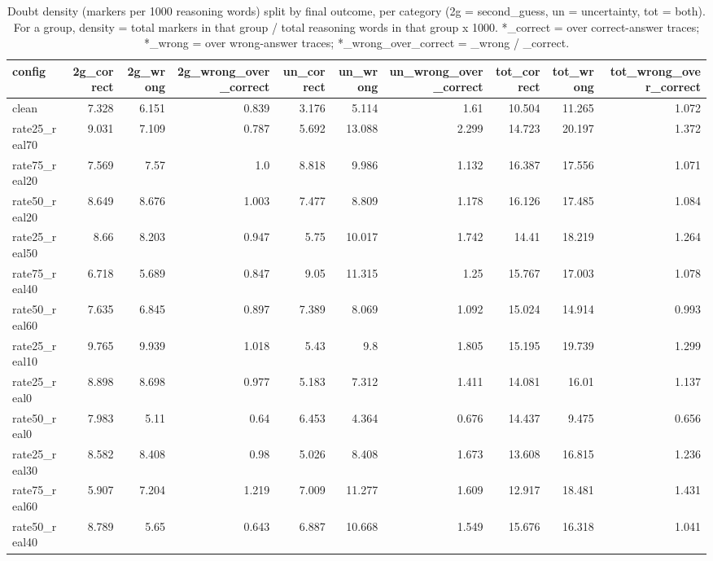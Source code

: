 \documentclass[11pt]{article}
\begin{document}
\begin{table}[H]
\centering
\caption{Doubt density (markers per 1000 reasoning words) split by final outcome, per category (2g = second\_guess, un = uncertainty, tot = both). For a group, density = total markers in that group / total reasoning words in that group x 1000. *\_correct = over correct-answer traces; *\_wrong = over wrong-answer traces; *\_wrong\_over\_correct = \_wrong / \_correct.}
\small
\begin{adjustbox}{max width=\textwidth}
\begin{tabular}{lrrrrrrrrr}
\toprule
\textbf{config} & \textbf{2g\_correct} & \textbf{2g\_wrong} & \textbf{2g\_wrong\_over\_correct} & \textbf{un\_correct} & \textbf{un\_wrong} & \textbf{un\_wrong\_over\_correct} & \textbf{tot\_correct} & \textbf{tot\_wrong} & \textbf{tot\_wrong\_over\_correct} \\
\midrule
clean & 7.328 & 6.151 & 0.839 & 3.176 & 5.114 & 1.61 & 10.504 & 11.265 & 1.072 \\
rate25\_real70 & 9.031 & 7.109 & 0.787 & 5.692 & 13.088 & 2.299 & 14.723 & 20.197 & 1.372 \\
rate75\_real20 & 7.569 & 7.57 & 1.0 & 8.818 & 9.986 & 1.132 & 16.387 & 17.556 & 1.071 \\
rate50\_real20 & 8.649 & 8.676 & 1.003 & 7.477 & 8.809 & 1.178 & 16.126 & 17.485 & 1.084 \\
rate25\_real50 & 8.66 & 8.203 & 0.947 & 5.75 & 10.017 & 1.742 & 14.41 & 18.219 & 1.264 \\
rate75\_real40 & 6.718 & 5.689 & 0.847 & 9.05 & 11.315 & 1.25 & 15.767 & 17.003 & 1.078 \\
rate50\_real60 & 7.635 & 6.845 & 0.897 & 7.389 & 8.069 & 1.092 & 15.024 & 14.914 & 0.993 \\
rate25\_real10 & 9.765 & 9.939 & 1.018 & 5.43 & 9.8 & 1.805 & 15.195 & 19.739 & 1.299 \\
rate25\_real0 & 8.898 & 8.698 & 0.977 & 5.183 & 7.312 & 1.411 & 14.081 & 16.01 & 1.137 \\
rate50\_real0 & 7.983 & 5.11 & 0.64 & 6.453 & 4.364 & 0.676 & 14.437 & 9.475 & 0.656 \\
rate25\_real30 & 8.582 & 8.408 & 0.98 & 5.026 & 8.408 & 1.673 & 13.608 & 16.815 & 1.236 \\
rate75\_real60 & 5.907 & 7.204 & 1.219 & 7.009 & 11.277 & 1.609 & 12.917 & 18.481 & 1.431 \\
rate50\_real40 & 8.789 & 5.65 & 0.643 & 6.887 & 10.668 & 1.549 & 15.676 & 16.318 & 1.041 \\

\end{tabular}
\end{adjustbox}
\end{table}
\end{document}

